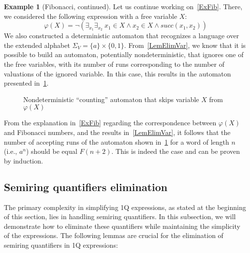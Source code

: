 \documentclass[12pt]{article}
\theoremstyle{definition}
\newtheorem{example}{Example}[section]
\begin{document}
\begin{example}[Fibonacci, continued]
\label{ExFibCont}
    Let us continue working on~\cref{ExFib}. There, we considered the following expression with a free variable $X$:
    $$\varphi(X) = \neg(\exists_{x_1}\exists_{x_2} \ x_1 \in X \land x_2 \in X \land succ(x_1, x_2))$$
    We also constructed a deterministic automaton that recognizes a language over the extended alphabet $\Sigma_V = \{a\} \times \{0,1\}$. From~\cref{LemElimVar}, we know that it is possible to build an automaton, potentially nondeterministic, that ignores one of the free variables, with its number of runs corresponding to the number of valuations of the ignored variable. In this case, this results in the automaton presented in~\cref{fig:my_label2}.

    \begin{figure}[ht]
        \centering
        \caption{Nondeterministic ``counting'' automaton that skips variable $X$ from $\varphi(X)$}
        \label{fig:my_label2}
    \end{figure}

    From the explanation in~\cref{ExFib} regarding the correspondence between $\varphi(X)$ and Fibonacci numbers, and the results in~\cref{LemElimVar}, it follows that the number of accepting runs of the automaton shown in~\cref{fig:my_label2} for a word of length $n$ (i.e., $a^n$) should be equal $F(n+2)$. This is indeed the case and can be proven by induction.
\end{example}

\subsection{Semiring quantifiers elimination}
The primary complexity in simplifying 1Q expressions, as stated at the beginning of this section, lies in handling semiring quantifiers. In this subsection, we will demonstrate how to eliminate these quantifiers while maintaining the simplicity of the expressions. The following lemmas are crucial for the elimination of semiring quantifiers in 1Q expressions:
\end{document}
